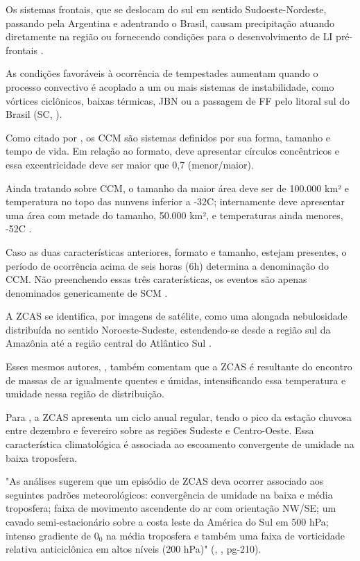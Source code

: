 \indent Os sistemas frontais, que se deslocam do sul em sentido Sudoeste-Nordeste, passando pela Argentina e adentrando o Brasil, causam precipitação atuando diretamente na região ou fornecendo condições para o desenvolvimento de \acrfull{LI} pré-frontais \cite{reboita2010}.

\indent As condições favoráveis à ocorrência de tempestades aumentam quando o processo convectivo é acoplado a um ou mais sistemas de instabilidade, como vórtices ciclônicos, baixas térmicas, \acrfull{JBN} ou a passagem de \acrlong{FF} pelo litoral sul do Brasil (\acrlong{SC}, \citeyear{AtlasSCnatureza}).

\indent Como citado por , os \acrfull{CCM} são sistemas definidos por sua forma, tamanho e tempo de vida. Em relação ao formato, deve apresentar círculos concêntricos e essa excentricidade deve ser maior que 0,7 (menor/maior).

\indent Ainda tratando sobre \acrshort{CCM}, o tamanho da maior área deve ser de 100.000 km² e temperatura no topo das nunvens inferior a -32C; internamente deve apresentar uma área com metade do tamanho, 50.000 km², e temperaturas ainda menores, -52C .

\indent  Caso as duas características anteriores, formato e tamanho, estejam presentes, o período de ocorrência acima de seis horas (6h) determina a denominação do \acrshort{CCM}. Não preenchendo essas três caraterísticas, os eventos são apenas denominados genericamente de \acrfull{SCM} .

\indent A \acrfull{ZCAS} se identifica, por imagens de satélite, como uma alongada nebulosidade distribuída no sentido Noroeste-Sudeste, estendendo-se desde a região sul da Amazônia até a região central do Atlântico Sul \cite{ClimatologiaBasica}.

\indent Esses mesmos autores, , também comentam que a \acrshort{ZCAS} é resultante do encontro de massas de ar igualmente quentes e úmidas, intensificando essa temperatura e umidade nessa região de distribuição.

\indent Para , a \acrshort{ZCAS} apresenta um ciclo anual regular, tendo o pico da estação chuvosa entre dezembro e fevereiro sobre as regiões Sudeste e Centro-Oeste. Essa característica climatológica é associada ao escoamento convergente de umidade na baixa troposfera.

\begin{citacao}
"As análises sugerem que um episódio de \acrshort{ZCAS} deva ocorrer associado aos seguintes padrões meteorológicos: convergência de umidade na baixa e média troposfera; faixa de movimento ascendente do ar com orientação NW/SE; um cavado semi-estacionário sobre a costa leste da América do Sul em 500 hPa; intenso gradiente de 0$_0$ na média troposfera e também uma faixa de vorticidade relativa anticiclônica em altos níveis (200 hPa)" (\citeauthor{ZCASquadro}, \citeyear{ZCASquadro}, pg-210).
\end{citacao}

